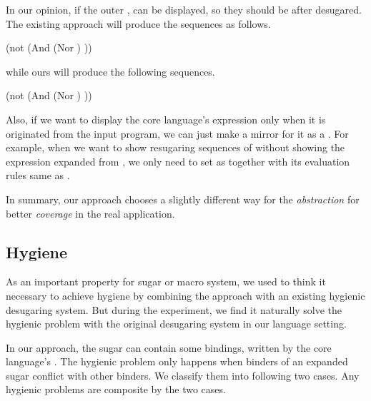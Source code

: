 In our opinion, if the outer ,  can be displayed, so they should be after desugared.
The existing approach will produce the sequences as follows.
\begin{footnotesize}
\begin{Codes}
    (not (And (Nor \false \true) \true))
\OneStep{ \true}
\end{Codes}
\end{footnotesize}
while ours will produce the following sequences.
\begin{footnotesize}
\begin{Codes}
    (not (And (Nor \false \true) \true))
\OneStep{ \true}
\end{Codes}
\end{footnotesize}

Also, if we want to display the core language's expression only when it is originated from the input program, we can just make a mirror for it as a . For example, when we want to show resugaring sequences of 
without showing the  expression expanded from , we only need to set  as  together with its evaluation rules same as .

In summary, our approach chooses a slightly different way for the \emph{abstraction} for better \emph{coverage} in the real application.
\subsection{Hygiene}
\label{mark:hygiene}

As an important property for sugar or macro system, we used to think it necessary to achieve hygiene by combining the approach with an existing hygienic desugaring system. But during the experiment, we find it naturally solve the hygienic problem with the original desugaring system in our language setting.

In our approach, the sugar can contain some bindings, written by the core language's . The hygienic problem only happens when binders of an expanded sugar conflict with other binders. We classify them into following two cases. Any hygienic problems are composite by the two cases.

